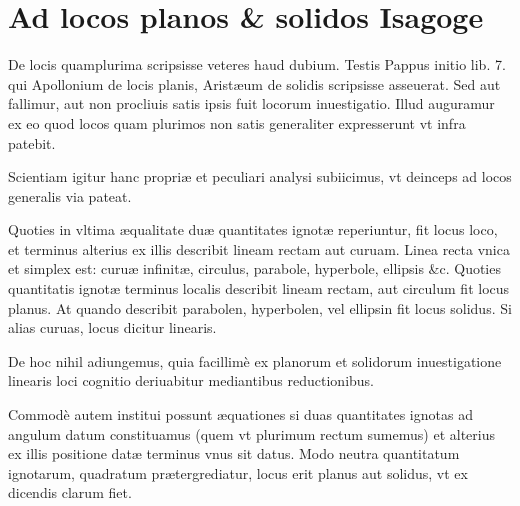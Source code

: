 \documentclass[11pt,a4paper]{article}
\begin{document}

\section*{Ad locos planos \& solidos Isagoge}

De locis quamplurima scripsisse veteres haud dubium. Testis Pappus initio lib. 7. qui Apollonium de locis planis, Aristæum de solidis scripsisse asseuerat. Sed aut fallimur, aut non procliuis satis ipsis fuit locorum inuestigatio. Illud auguramur ex eo quod locos quam plurimos non satis generaliter expresserunt vt infra patebit.

Scientiam igitur hanc propriæ et peculiari analysi subiicimus, vt deinceps ad locos generalis via pateat.

Quoties in vltima æqualitate duæ quantitates ignotæ reperiuntur, fit locus loco, et terminus alterius ex illis describit lineam rectam aut curuam. Linea recta vnica et simplex est: curuæ infinitæ, circulus, parabole, hyperbole, ellipsis \&c. Quoties quantitatis ignotæ terminus localis describit lineam rectam, aut circulum fit locus planus. At quando describit parabolen, hyperbolen, vel ellipsin fit locus solidus. Si alias curuas, locus dicitur linearis.


De hoc nihil adiungemus, quia facillimè ex planorum et solidorum inuestigatione linearis loci cognitio deriuabitur mediantibus reductionibus.

Commodè autem institui possunt æquationes si duas quantitates ignotas ad angulum datum constituamus (quem vt plurimum rectum sumemus) et alterius ex illis positione datæ terminus vnus sit datus. Modo neutra quantitatum ignotarum, quadratum prætergrediatur, locus erit planus aut solidus, vt ex dicendis clarum fiet.
\end{document}
